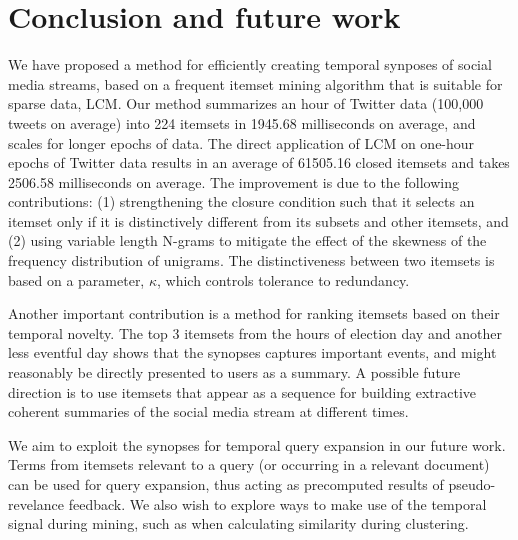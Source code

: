 \documentclass{sig-alternate}
\begin{document}
 

\section{Conclusion and future work}
\label{sec:concfut}
We have proposed a method for efficiently creating temporal synposes of social
media streams, based on a frequent itemset mining algorithm that is suitable
for sparse data, LCM.
Our method summarizes an hour of Twitter data (100,000 tweets on average) into
224 itemsets in 1945.68 milliseconds on average,
and scales for longer epochs of data.
The direct application of LCM on one-hour epochs of Twitter data results in
an average of 61505.16 closed itemsets and takes 2506.58 milliseconds on
average.
The improvement is due to the following contributions: 
(1) strengthening  the closure condition such that it selects an itemset only if
it is distinctively different from its subsets and other itemsets, and 
(2) using variable length N-grams to mitigate the effect
of the skewness of the frequency distribution of unigrams.
The distinctiveness between two itemsets is based on a parameter, $\kappa$, which controls tolerance to redundancy. %

Another important contribution is a method for ranking itemsets based on their temporal novelty.
The top 3 itemsets from the hours of election day and another less eventful
day shows that the synopses captures important events, and might reasonably
be directly presented to users as a summary.
A possible future direction is to use itemsets that appear as a sequence for
building extractive coherent summaries of the social media stream at
different times.

We aim to exploit the synopses for temporal query expansion in our future work. Terms from itemsets relevant to a query (or occurring in a relevant document)
can be used for query expansion, thus acting as precomputed results of 
pseudo-revelance feedback.
We also wish to explore ways to make use of the temporal signal during mining,
such as when calculating similarity during clustering.

 





%
%
\end{document}
